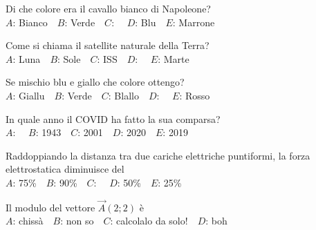 \mcquestionfooter



\def\mcquestionnumber{10}


\mcquestionheader Di che colore era il cavallo bianco di Napoleone?\\
{$A$}: Bianco\ \ {$B$}: Verde\ \ {$C$}: \ \ {$D$}: Blu\ \ {$E$}: Marrone\ \ 

\mcquestionfooter



\def\mcquestionnumber{11}


\mcquestionheader Come si chiama il satellite naturale della Terra?\\
{$A$}: Luna\ \ {$B$}: Sole\ \ {$C$}: ISS\ \ {$D$}: \ \ {$E$}: Marte\ \ 

\mcquestionfooter



\def\mcquestionnumber{12}


\mcquestionheader Se mischio blu e giallo che colore ottengo?\\
{$A$}: Giallu\ \ {$B$}: Verde\ \ {$C$}: Blallo\ \ {$D$}: \ \ {$E$}: Rosso\ \ 

\mcquestionfooter



\mcpaperfooter

\def\mcserialnumber{32}
\mcpaperheader


\def\mcquestionnumber{1}


\mcquestionheader In quale anno il COVID ha fatto la sua comparsa?\\
{$A$}: \ \ {$B$}: 1943\ \ {$C$}: 2001\ \ {$D$}: 2020\ \ {$E$}: 2019\ \ 

\mcquestionfooter



\def\mcquestionnumber{2}


\mcquestionheader Raddoppiando la distanza tra due cariche elettriche puntiformi, la forza elettrostatica diminuisce del\\
{$A$}: 75\%\ \ {$B$}: 90\%\ \ {$C$}: \ \ {$D$}: 50\%\ \ {$E$}: 25\%\ \ 

\mcquestionfooter



\def\mcquestionnumber{3}


\mcquestionheader Il modulo del vettore $\vec{A}(2;2)$ è\\
{$A$}: chissà\ \ {$B$}: non so\ \ {$C$}: calcolalo da solo!\ \ {$D$}: boh\ \ 

\mcquestionfooter



